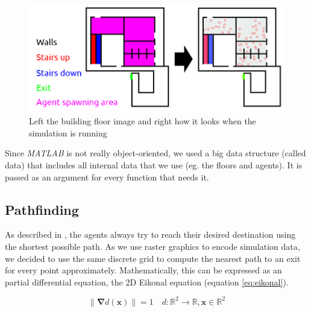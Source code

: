 \documentclass[11pt]{article}
\begin{document}
\begin{figure}[h]
\centering
\includegraphics[width=\textwidth]{./images/config_floor_description.png}
\caption{Left the building floor image and right how it looks when the
simulation is running} 
\label{building floor image}
\end{figure}

Since \textit{MATLAB} is not really object-oriented, we used a big data structure (called
data) that includes all internal data that we use (eg. the floors and agents).
It is passed as an argument for every function that needs it.

\subsection{Pathfinding}
As described in \cite{SFMPD}, the agents always try to reach their desired destination
using the shortest possible path. As we use raster graphics to encode simulation data,
we decided to use the same discrete grid to compute the nearest path to an exit for every point approximately.
Mathematically, this can be expressed as an partial differential equation, the 2D Eikonal equation (equation \ref{eq:eikonal}).

\begin{equation} \label{eq:eikonal}
\|\mathbf{\nabla} d(\mathbf{x})\|=1 \quad d:\!\mathbb{R}^{2}\to\mathbb{R},\mathbf{x}\in\mathbb{R}^{2}
\end{equation}
\end{document}
